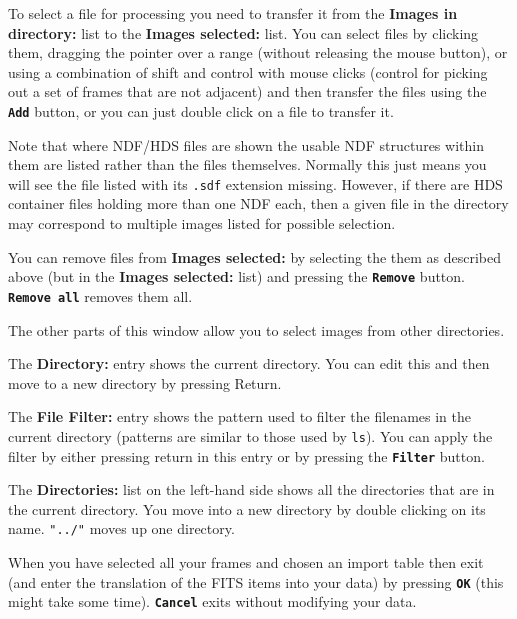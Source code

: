 \documentclass[11pt,nolof]{starlink}
\providecommand{\butt}[1]{{\bf \tt #1}}
\providecommand{\wlab}[1]{{\bf #1}}
\providecommand{\text}[1]{{\tt #1}}
\begin{document}
To select a file for processing you need to transfer it from the
\wlab{Images in directory:} list to the \wlab{Images selected:} list.
You can select files by clicking them, dragging the pointer over
a range (without releasing the mouse button), or using a combination
of shift and control with mouse clicks (control for picking out a set of
frames that are not adjacent) and then transfer the files using the
\butt{Add} button, or you can just double click on a file to transfer it.

Note that where NDF/HDS files are shown the usable NDF structures
within them are listed rather than the files themselves.
Normally this just means you will see the file listed
with its \text{.sdf} extension missing.  However, if there are HDS
container files holding more than one NDF each, then a given
file in the directory may correspond to multiple images listed
for possible selection.

You can remove files from \wlab{Images selected:} by selecting the
them as described above (but in the \wlab{Images selected:} list) and
pressing the \butt{Remove} button. \butt{Remove all} removes them all.

The other parts of this window allow you to select images from other
directories.


The \wlab{Directory:} entry shows the
current directory. You can edit this and then move to a new directory
by pressing Return.


The \wlab{File Filter:} entry shows the
pattern used to filter the filenames in the current directory
(patterns are similar to those used by \text{ls}). You can apply the
filter by either pressing return in this entry or by pressing the
\butt{Filter} button.


The \wlab{Directories:} list on the
left-hand side shows all the directories that are in the current
directory. You move into a new directory by double clicking on its
name. \text{"../"} moves up one directory.


When you have selected all your frames and
chosen an import table then exit (and enter the translation of the
FITS items into your data) by pressing \butt{OK} (this might take some
time).
\butt{Cancel} exits without modifying your data.
\end{document}
